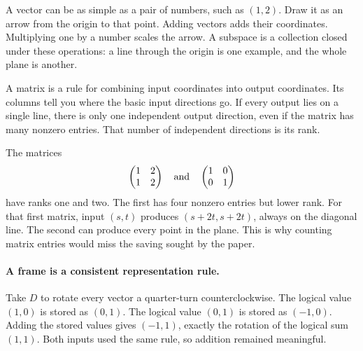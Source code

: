 
A vector can be as simple as a pair of numbers, such as $(1,2)$.
Draw it as an arrow from the origin to that point. Adding vectors adds their
coordinates. Multiplying one by a number scales the arrow. A subspace is a
collection closed under these operations: a line through the origin is one
example, and the whole plane is another.

A matrix is a rule for combining input coordinates into output coordinates.
Its columns tell you where the basic input directions go. If every output
lies on a single line, there is only one independent output direction, even
if the matrix has many nonzero entries. That number of independent directions
is its rank.


The matrices
\[
 \begin{pmatrix}1&2\\1&2\end{pmatrix}
 \quad\hbox{and}\quad
 \begin{pmatrix}1&0\\0&1\end{pmatrix}
\]
have ranks one and two. The first has four nonzero entries but lower rank.
For that first matrix, input $(s,t)$ produces $(s+2t,s+2t)$, always on the
diagonal line. The second can produce every point in the plane. This is why
counting matrix entries would miss the saving sought by the paper.

\paragraph{A frame is a consistent representation rule.}
Take $D$ to rotate every vector a quarter-turn counterclockwise. The logical
value $(1,0)$ is stored as $(0,1)$. The logical value $(0,1)$ is stored as
$(-1,0)$. Adding the stored values gives $(-1,1)$, exactly the rotation of
the logical sum $(1,1)$. Both inputs used the same rule, so addition remained
meaningful.


